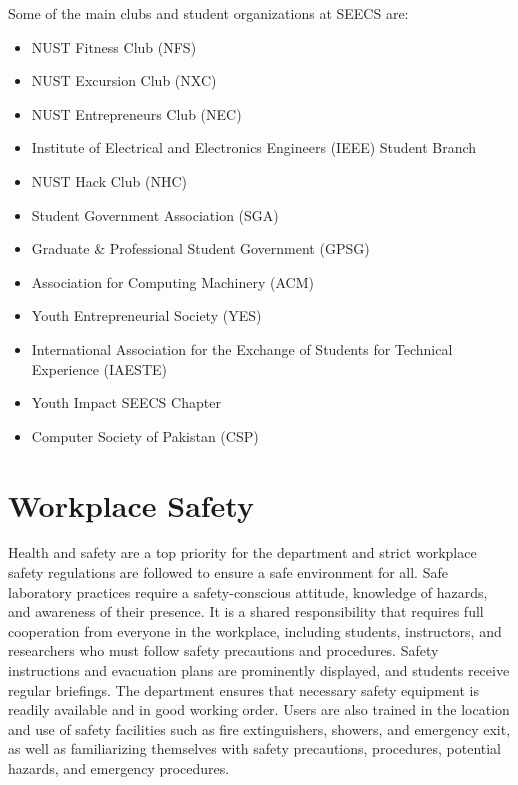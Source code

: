 Some of the main clubs and student organizations at SEECS are:

\begin{itemize}[itemsep=1pt, topsep=2pt, parsep=0pt]
    \item NUST Fitness Club (NFS)
    \item NUST Excursion Club (NXC)
    \item NUST Entrepreneurs Club (NEC)
    \item Institute of Electrical and Electronics Engineers (IEEE) Student Branch
    \item NUST Hack Club (NHC)
    \item Student Government Association (SGA)
    \item Graduate \& Professional Student Government (GPSG)
    \item Association for Computing Machinery (ACM)
    \item Youth Entrepreneurial Society (YES)
    \item International Association for the Exchange of Students for Technical Experience (IAESTE)
    \item Youth Impact SEECS Chapter
    \item Computer Society of Pakistan (CSP)
\end{itemize}



\hypertarget{workplace-safety}{%
\section{Workplace Safety}\label{workplace-safety}}

Health and safety are a top priority for the department and strict workplace safety regulations are followed to ensure a safe environment for all. Safe laboratory practices require a safety-conscious attitude, knowledge of hazards, and awareness of their presence. It is a shared responsibility that requires full cooperation from everyone in the workplace, including students, instructors, and researchers who must follow safety precautions and procedures. Safety instructions and evacuation plans are prominently displayed, and students receive regular briefings. The department ensures that necessary safety equipment is readily available and in good working order. Users are also trained in the location and use of safety facilities such as fire extinguishers, showers, and emergency exit, as well as familiarizing themselves with safety precautions, procedures, potential hazards, and emergency procedures.


